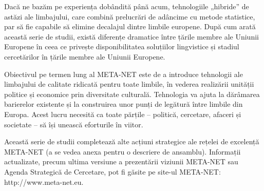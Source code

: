 \begin{multicols}{2}

Dacă ne bazăm pe experiența dobândită până acum, tehnologiile „hibride” de astăzi ale limbajului, care combină prelucrări de adâncime cu metode statistice, par să fie capabile să elimine decalajul dintre limbile europene. După cum arată această serie de studii, există diferențe dramatice între țările membre ale Uniunii Europene în ceea ce privește disponibilitatea soluțiilor lingvistice și stadiul cercetărilor în țările membre ale Uniunii Europene.

Obiectivul pe termen lung al META-NET este de a introduce tehnologii ale limbajului de calitate ridicată pentru toate limbile, în vederea realizării unității politice și economice prin diversitate culturală. Tehnologia va ajuta la dărâmarea barierelor existente și la construirea unor punți de legătură între limbile din Europa. Acest lucru necesită ca toate părțile -- politică, cercetare, afaceri și societate -- să își unească eforturile în viitor.

Această serie de studii completează alte acțiuni strategice ale rețelei de excelență META-NET (a se vedea anexa pentru o descriere de ansamblu). Informații actualizate, precum ultima versiune a prezentării viziunii META-NET \cite{Meta1} sau Agenda Strategică de Cercetare, pot fi găsite pe site-ul META-NET: http://www.meta-net.eu.
\end{multicols}

\clearpage


